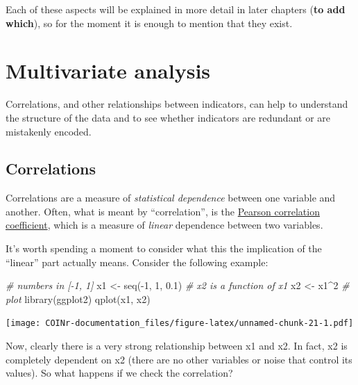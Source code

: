 \documentclass[
]{book}
\newenvironment{Shaded}{\begin{snugshade}}{\end{snugshade}}
\newcommand{\CommentTok}[1]{\textcolor[rgb]{0.56,0.35,0.01}{\textit{#1}}}
\newcommand{\DecValTok}[1]{\textcolor[rgb]{0.00,0.00,0.81}{#1}}
\newcommand{\FloatTok}[1]{\textcolor[rgb]{0.00,0.00,0.81}{#1}}
\newcommand{\FunctionTok}[1]{\textcolor[rgb]{0.00,0.00,0.00}{#1}}
\newcommand{\NormalTok}[1]{#1}
\newcommand{\OtherTok}[1]{\textcolor[rgb]{0.56,0.35,0.01}{#1}}
\newcommand{\SpecialCharTok}[1]{\textcolor[rgb]{0.00,0.00,0.00}{#1}}
\begin{document}
Each of these aspects will be explained in more detail in later chapters (\textbf{to add which}), so for the moment it is enough to mention that they exist.

\hypertarget{multivariate-analysis}{%
\chapter{Multivariate analysis}\label{multivariate-analysis}}

Correlations, and other relationships between indicators, can help to understand the structure of the data and to see whether indicators are redundant or are mistakenly encoded.

\hypertarget{correlations}{%
\section{Correlations}\label{correlations}}

Correlations are a measure of \emph{statistical dependence} between one variable and another. Often, what is meant by ``correlation'', is the \href{https://en.wikipedia.org/wiki/Pearson_correlation_coefficient}{Pearson correlation coefficient}, which is a measure of \emph{linear} dependence between two variables.

It's worth spending a moment to consider what this the implication of the ``linear'' part actually means. Consider the following example:

\begin{Shaded}
\begin{Highlighting}[]
\CommentTok{\# numbers in [{-}1, 1]}
\NormalTok{x1 }\OtherTok{\textless{}{-}} \FunctionTok{seq}\NormalTok{(}\SpecialCharTok{{-}}\DecValTok{1}\NormalTok{, }\DecValTok{1}\NormalTok{, }\FloatTok{0.1}\NormalTok{)}
\CommentTok{\# x2 is a function of x1}
\NormalTok{x2 }\OtherTok{\textless{}{-}}\NormalTok{ x1}\SpecialCharTok{\^{}}\DecValTok{2}
\CommentTok{\# plot}
\FunctionTok{library}\NormalTok{(ggplot2)}
\FunctionTok{qplot}\NormalTok{(x1, x2)}
\end{Highlighting}
\end{Shaded}

\texttt{[image: COINr-documentation\_files/figure-latex/unnamed-chunk-21-1.pdf]}

Now, clearly there is a very strong relationship between x1 and x2. In fact, x2 is completely dependent on x2 (there are no other variables or noise that control its values). So what happens if we check the correlation?
\end{document}
